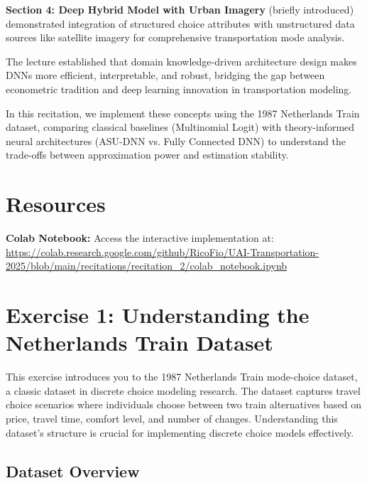 \documentclass[11pt]{article}
\begin{document}
\textbf{Section 4: Deep Hybrid Model with Urban Imagery} (briefly introduced) demonstrated integration of structured choice attributes with unstructured data sources like satellite imagery for comprehensive transportation mode analysis.

The lecture established that domain knowledge-driven architecture design makes DNNs more efficient, interpretable, and robust, bridging the gap between econometric tradition and deep learning innovation in transportation modeling.

In this recitation, we implement these concepts using the 1987 Netherlands Train dataset, comparing classical baselines (Multinomial Logit) with theory-informed neural architectures (ASU-DNN vs. Fully Connected DNN) to understand the trade-offs between approximation power and estimation stability.

\section*{Resources}

\textbf{Colab Notebook:} Access the interactive implementation at:\\
\url{https://colab.research.google.com/github/RicoFio/UAI-Transportation-2025/blob/main/recitations/recitation_2/colab_notebook.ipynb}

\section*{Exercise 1: Understanding the Netherlands Train Dataset}

\begin{center}
\end{center}

This exercise introduces you to the 1987 Netherlands Train mode-choice dataset, a classic dataset in discrete choice modeling research. The dataset captures travel choice scenarios where individuals choose between two train alternatives based on price, travel time, comfort level, and number of changes. Understanding this dataset's structure is crucial for implementing discrete choice models effectively.

\subsection*{Dataset Overview}
\end{document}
